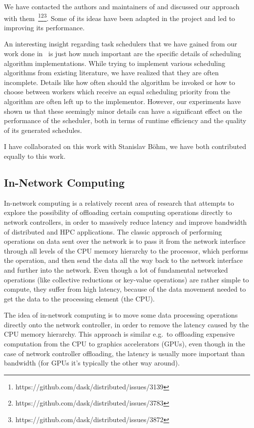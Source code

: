 We have contacted the authors and maintainers of \dask{} and discussed our \rsds{} approach with
them~\footnote{https://github.com/dask/distributed/issues/3139}\footnote{https://github.com/dask/distributed/issues/3783}\footnote{https://github.com/dask/distributed/issues/3872}.
Some of its ideas have been adapted in the \dask{} project and led to improving its performance.

An interesting insight regarding task schedulers that we have gained from our work done
in~\cite{estee,rsds} is just how much important are the specific details of scheduling algorithm
implementations. While trying to implement various scheduling algorithms from existing
literature, we have realized that they are often incomplete. Details like how
often should the algorithm be invoked or how to choose between workers which receive an equal
scheduling priority from the algorithm are often left up to the implementor. However, our
experiments have shown us that these seemingly minor details can have a significant effect on
the performance of the scheduler, both in terms of runtime efficiency and the quality of its
generated schedules.

I have collaborated on this work with Stanislav Böhm, we have both contributed equally to this
work.

\subsection{In-Network Computing}
In-network computing is a relatively recent area of research that attempts to explore the
possibility of offloading certain computing operations directly to network controllers, in order
to massively reduce latency and improve bandwidth of distributed and HPC applications. The classic
approach of performing operations on data sent over the network is to pass it from the network
interface through all levels of the CPU memory hierarchy to the processor, which performs the
operation, and then send the data all the way back to the network interface and further into the
network. Even though a lot of fundamental networked operations (like collective reductions or
key-value operations) are rather simple to compute, they suffer from high latency, because of the
data movement needed to get the data to the processing element (the CPU).

The idea of in-network computing is to move some data processing operations directly onto the
network controller, in order to remove the latency caused by the CPU memory hierarchy. This
approach is similar e.g.\ to offloading expensive computation from the CPU to graphics
accelerators (GPUs), even though in the case of network controller offloading, the latency is
usually more important than bandwidth (for GPUs it's typically the other way around).

